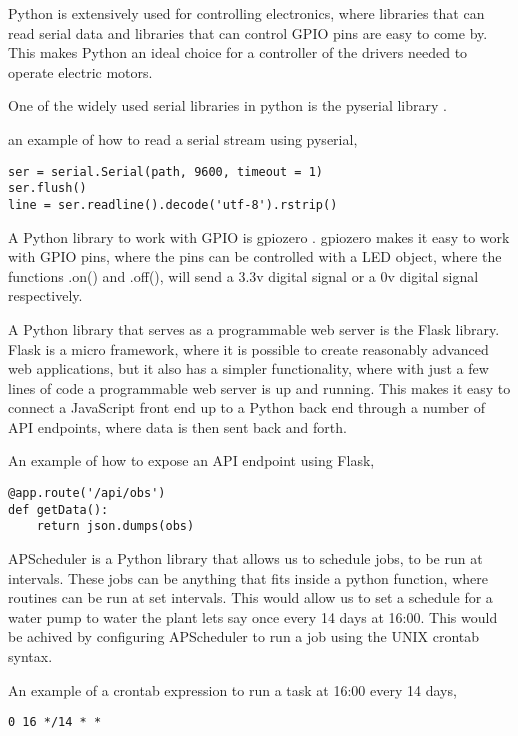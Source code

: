 \documentclass[12pt,a4paper,oneside]{book}
\begin{document}
Python is extensively used for controlling electronics, where libraries that can read serial data and libraries that can control GPIO pins are easy to come by. This makes Python an ideal choice for a controller of the drivers needed to operate electric motors.

\bigskip

One of the widely used serial libraries in python is the pyserial library \cite{pyserial}.

an example of how to read a serial stream using pyserial,

\begin{verbatim}
ser = serial.Serial(path, 9600, timeout = 1)
ser.flush()
line = ser.readline().decode('utf-8').rstrip()
\end{verbatim}

\bigskip

A Python library to work with GPIO is gpiozero \cite{gpiozero}.
gpiozero makes it easy to work with GPIO pins, where the pins can be controlled with a LED object, where the functions .on() and .off(), will send a 3.3v digital signal or a 0v digital signal respectively.

\bigskip

A Python library that serves as a programmable web server is the Flask library. Flask is a micro framework, where it is possible to create reasonably advanced web applications, but it also has a simpler functionality, where with just a few lines of code a programmable web server is up and running.
This makes it easy to connect a JavaScript front end up to a Python back end through a number of API endpoints, where data is then sent back and forth.

An example of how to expose an API endpoint using Flask,
\begin{verbatim}
@app.route('/api/obs')
def getData():
    return json.dumps(obs)
\end{verbatim}

\bigskip

APScheduler is a Python library that allows us to schedule jobs, to be run at intervals. These jobs can be anything that fits inside a python function, where routines can be run at set intervals. This would allow us to set a schedule for a water pump to water the plant lets say once every 14 days at 16:00.
This would be achived by configuring APScheduler to run a job using the UNIX crontab syntax.

\newpage

An example of a crontab expression to run a task at 16:00 every 14 days,
\begin{verbatim}
0 16 */14 * *
\end{verbatim}
\end{document}
